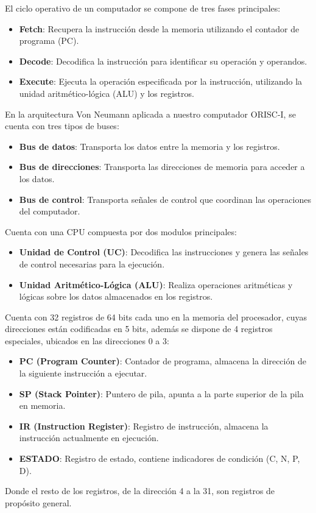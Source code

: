 \documentclass{article}
\begin{document}
El ciclo operativo de un computador se compone de tres fases principales:
\begin{itemize}
  \item \textbf{Fetch}: Recupera la instrucción desde la memoria utilizando el contador de programa (PC).
  \item \textbf{Decode}: Decodifica la instrucción para identificar su operación y operandos.
  \item \textbf{Execute}: Ejecuta la operación especificada por la instrucción, utilizando la unidad aritmético-lógica (ALU) y los registros.
\end{itemize}

En la arquitectura Von Neumann aplicada a nuestro computador ORISC-I, se cuenta con tres tipos de buses:
\begin{itemize}
  \item \textbf{Bus de datos}: Transporta los datos entre la memoria y los registros.
  \item \textbf{Bus de direcciones}: Transporta las direcciones de memoria para acceder a los datos.
  \item \textbf{Bus de control}: Transporta señales de control que coordinan las operaciones del computador.
\end{itemize}

Cuenta con una CPU compuesta por dos modulos principales:
\begin{itemize}
  \item \textbf{Unidad de Control (UC)}: Decodifica las instrucciones y genera las señales de control necesarias para la ejecución.
  \item \textbf{Unidad Aritmético-Lógica (ALU)}: Realiza operaciones aritméticas y lógicas sobre los datos almacenados en los registros.
\end{itemize}

Cuenta con 32 registros de 64 bits cada uno en la memoria del procesador, cuyas direcciones están codificadas en 5 bits, además se dispone de 4 registros especiales, ubicados en las direcciones 0 a 3:
\begin{itemize}
  \item \textbf{PC (Program Counter)}: Contador de programa, almacena la dirección de la siguiente instrucción a ejecutar.
  \item \textbf{SP (Stack Pointer)}: Puntero de pila, apunta a la parte superior de la pila en memoria.
  \item \textbf{IR (Instruction Register)}: Registro de instrucción, almacena la instrucción actualmente en ejecución.
  \item \textbf{ESTADO}: Registro de estado, contiene indicadores de condición (C, N, P, D).
\end{itemize}
Donde el resto de los registros, de la dirección 4 a la 31, son registros de propósito general.
\end{document}
